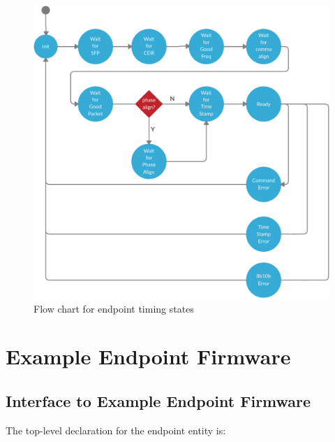 \documentclass{dune}
\begin{document}
\begin{figure}
    \centering
    \includegraphics[width=\textwidth]{DUNE SP Timing System States-crop.pdf}
    \caption{Flow chart for endpoint timing states}
    \label{fig:ep_status_flow}
\end{figure}
\clearpage

\appendix





\section{Example Endpoint Firmware}

\subsection{Interface to Example Endpoint Firmware }

The top-level declaration for the endpoint entity is:
\end{document}
